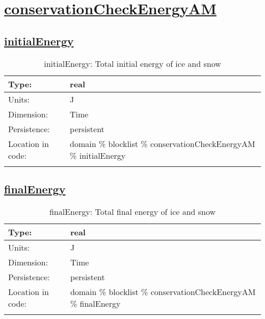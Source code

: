 \section[conservationCheckEnergyAM]{\hyperref[sec:var_tab_conservationCheckEnergyAM]{conservationCheckEnergyAM}}
\label{sec:var_sec_conservationCheckEnergyAM}
\subsection[initialEnergy]{\hyperref[sec:var_tab_conservationCheckEnergyAM]{initialEnergy}}
\label{subsec:var_sec_conservationCheckEnergyAM_initialEnergy}
\begin{center}
\begin{longtable}{| p{2.0in} | p{4.0in} |}
        \hline 
        Type: & real \\
        \hline 
        Units: & \si{J} \\
        \hline 
        Dimension: & Time \\
        \hline 
        Persistence: & persistent \\
        \hline 
         Location in code: & domain \% blocklist \% conservationCheckEnergyAM \% initialEnergy \\
         \hline 
    \caption{initialEnergy: Total initial energy of ice and snow}
\end{longtable}
\end{center}
\subsection[finalEnergy]{\hyperref[sec:var_tab_conservationCheckEnergyAM]{finalEnergy}}
\label{subsec:var_sec_conservationCheckEnergyAM_finalEnergy}
\begin{center}
\begin{longtable}{| p{2.0in} | p{4.0in} |}
        \hline 
        Type: & real \\
        \hline 
        Units: & \si{J} \\
        \hline 
        Dimension: & Time \\
        \hline 
        Persistence: & persistent \\
        \hline 
         Location in code: & domain \% blocklist \% conservationCheckEnergyAM \% finalEnergy \\
         \hline 
    \caption{finalEnergy: Total final energy of ice and snow}
\end{longtable}
\end{center}
